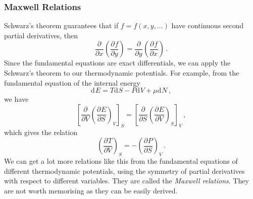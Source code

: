 \documentclass{article}
\theoremstyle{plain}\theoremheaderfont{\normalfont\bfseries}\theorembodyfont{\rmfamily}\theoremseparator{.}\newtheorem*{thm}{Theorem}\newtheorem*{law}{Law}\newtheorem*{pos}{Postulate}
\numberwithin{equation}{section}
\renewcommand{\d}[2][]{\mathrm{d}^{#1} #2}
\newcommand{\pdv}[3][]{\frac{\partial^{#1} #2}{{\partial #3}^{#1}}}
\begin{document}
    \subsubsection{Maxwell Relations}
    Schwarz's theorem guarantees that if \(f=f(x,y,\dots)\) have continuous second partial derivatives, then
    \begin{equation}
        \pdv{}{x}\left(\pdv{f}{y}\right)=\pdv{}{y}\left(\pdv{f}{x}\right)\,.
    \end{equation}
    Since the fundamental equations are exact differentials, we can apply the Schwarz's theorem to our thermodynamic potentials. For example, from the fundamental equation of the internal energy
    \begin{equation}
        \d{E}=T\d{S}-P\d{V}+\mu\d{N}\,,
    \end{equation}
    we have
    \begin{equation}
        \left[\pdv{}{V}\left(\pdv{E}{S}\right)_V\right]_{S}=\left[\pdv{}{S}\left(\pdv{E}{V}\right)_S\right]_{V}\,,
    \end{equation}
    which gives the relation
    \begin{equation}
        \left(\pdv{T}{V}\right)_{S}=-\left(\pdv{P}{S}\right)_{V}\,.
    \end{equation}
    We can get a lot more relations like this from the fundamental equations of different thermodynamic potentials, using the symmetry of partial derivatives with respect to different variables. They are called the \textit{Maxwell relations}. They are not worth memorising as they can be easily derived.
\end{document}
